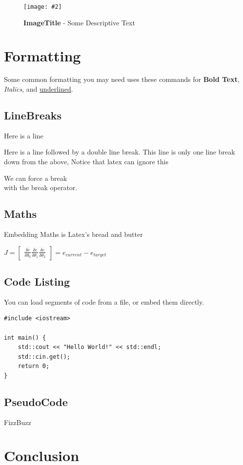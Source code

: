 \documentclass[10pt, a4paper]{article}
\newcommand{\figuremacro}[5]{
    \begin{figure}[#1]
        \centering
        \texttt{[image: \#2]}
        \caption[#3]{\textbf{#3}#4}
        \label{fig:#2}
    \end{figure}
}
\begin{document}
    \figuremacro{h}{placeholder}{ImageTitle}{ - Some Descriptive Text}{1.0}
	
	\section{Formatting}
	Some common formatting you may need uses these commands for \textbf{Bold Text}, \textit{Italics}, and \underline{underlined}.
	\subsection{LineBreaks}
	Here is a line
    
    Here is a line followed by a double line break.
	This line is only one line break down from the above, Notice that latex can ignore this
    
    We can force a break \\ with the break operator.
    
	\subsection{Maths}
    Embedding Maths is Latex's bread and butter    
    
    {\centering \Large \(
        J = \begin{bmatrix}
            \frac{\delta e}{\delta \theta _0}
            \frac{\delta e}{\delta \theta _1}
            \frac{\delta e}{\delta \theta _2}
        \end{bmatrix}
        = e_{current} - e_{target} 
    \)\par}
	
	\subsection{Code Listing}
    You can load segments of code from a file, or embed them directly.
    
\begin{lstlisting}[caption = Hello World! in c++]
#include <iostream>

int main() {
    std::cout << "Hello World!" << std::endl;
    std::cin.get();
    return 0;
}
\end{lstlisting}


    
\subsection{PseudoCode}

\begin{algorithm}[h]
\caption{FizzBuzz}
\end{algorithm}
	
\section{Conclusion}	


		
\end{document}

